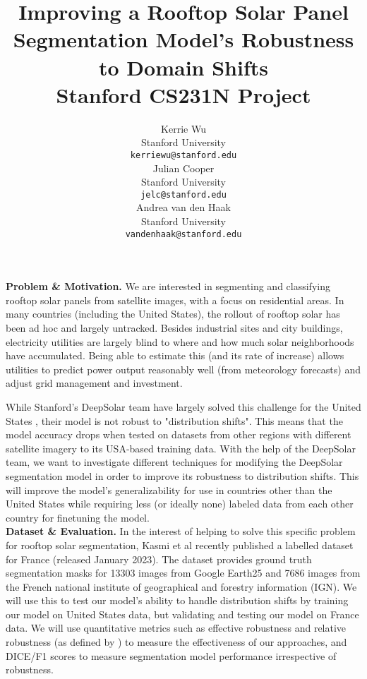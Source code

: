 \documentclass{article}
\title{
  Improving a Rooftop Solar Panel Segmentation Model's Robustness to Domain Shifts \\
  \vspace{0.15cm}
  {\normalfont Stanford CS231N Project}  
}
\author{
  Kerrie Wu \\
  Stanford University \\
  \texttt{kerriewu@stanford.edu} \\
   \And
    Julian Cooper \\
  Stanford University \\
  \texttt{jelc@stanford.edu} \\
   \And
   Andrea van den Haak \\
  Stanford University \\
  \texttt{vandenhaak@stanford.edu} \\
}
\newcommand{\note}[1]{\textcolor{blue}{{#1}}}
\begin{document}
\maketitle



\textbf{Problem \& Motivation.}
We are interested in segmenting and classifying rooftop solar panels from satellite images, with a focus on residential areas. In many countries (including the United States), the rollout of rooftop solar has been ad hoc and largely untracked. Besides industrial sites and city buildings, electricity utilities are largely blind to where and how much solar neighborhoods have accumulated. Being able to estimate this (and its rate of increase) allows utilities to predict power output reasonably well (from meteorology forecasts) and adjust grid management and investment.

While Stanford's DeepSolar team have largely solved this challenge for the United States \cite{DeepSolar1} \cite{DeepSolar2}, their model is not robust to "distribution shifts". This means that the model accuracy drops when tested on datasets from other regions with different satellite imagery to its USA-based training data. With the help of the DeepSolar team, we want to investigate different techniques for modifying the DeepSolar segmentation model in order to improve its robustness to distribution shifts. This will improve the model's generalizability for use in countries other than the United States while requiring less (or ideally none) labeled data from each other country for finetuning the model. \\

\textbf{Dataset \& Evaluation.}
In the interest of helping to solve this specific problem for rooftop solar segmentation, Kasmi et al \cite{Kasmi2023} recently published a labelled dataset for France (released January 2023). The dataset provides ground truth segmentation masks for 13303 images from Google Earth25 and 7686 images from the French national institute of geographical and forestry information (IGN). We will use this to test our model's ability to handle distribution shifts by training our model on United States data, but validating and testing our model on France data. We will use quantitative metrics such as effective robustness and relative robustness (as defined by \cite{Taori2020}) to measure the effectiveness of our approaches, and DICE/F1 scores to measure segmentation model performance irrespective of robustness. \\
\end{document}
